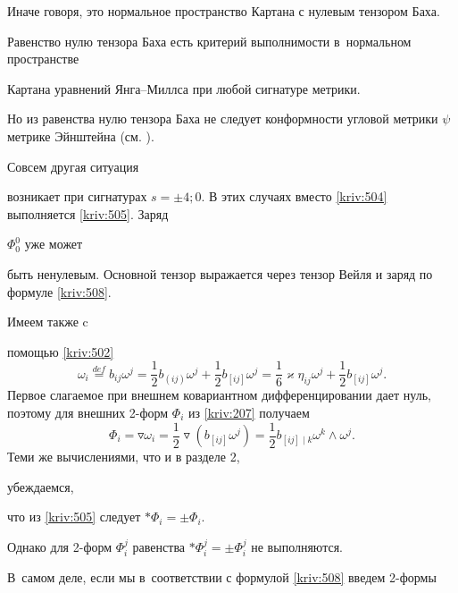 Иначе говоря,  это нормальное пространство Картана  с нулевым тензором Баха. 

Равенство нулю тензора  Баха есть критерий выполнимости в~нормальном пространстве

Картана уравнений Янга--Миллса при любой сигнатуре метрики. 

Но из равенства нулю тензора Баха не  следует конформности угловой метрики $\psi $ метрике Эйнштейна (см. \cite{bib:kriv:9}).



Совсем другая ситуация 

возникает при сигнатурах $s=\pm 4;0.$ В этих случаях вместо \eqref{kriv:504} выполняется \eqref{kriv:505}. Заряд

$\Phi _{0}^{0}$ уже может 

быть ненулевым. Основной тензор выражается через тензор Вейля и заряд по формуле \eqref{kriv:508}. 

Имеем также c 

помощью \eqref{kriv:502}\begin{equation*}

\omega _{i}\overset{def}{=}b_{ij}\omega ^{j}=\frac{1}{2}b_{\left( ij\right)

}\omega ^{j}+\frac{1}{2}b_{\left[ ij\right] }\omega ^{j}=\frac{1}{6}\varkappa \eta _{ij}\omega ^{j}+\frac{1}{2}b_{\left[ ij\right] }\omega ^{j}.

\end{equation*}Первое слагаемое при внешнем ковариантном дифференцировании дает нуль, поэтому для внешних 2-форм $\Phi _{i}$ из \eqref{kriv:207} получаем\begin{equation*}

\Phi _{i}=\triangledown \omega _{i}=\frac{1}{2}\triangledown \left( b_{\left[

ij\right] }\omega ^{j}\right) =\frac{1}{2}b_{\left[ ij\right] \mid k}\omega

^{k}\wedge \omega ^{j}.

\end{equation*}Теми же вычислениями, что и в разделе 2, 

убеждаемся, 

что из \eqref{kriv:505} следует $\ast \Phi _{i}=\pm \Phi _{i}.$ 

Однако для 2-форм $\Phi _{i}^{j}$ равенства $\ast \Phi _{i}^{j}=\pm \Phi _{i}^{j}$ не выполняются. 

В~самом деле, если мы в~соответствии с формулой \eqref{kriv:508} введем 2-формы 

